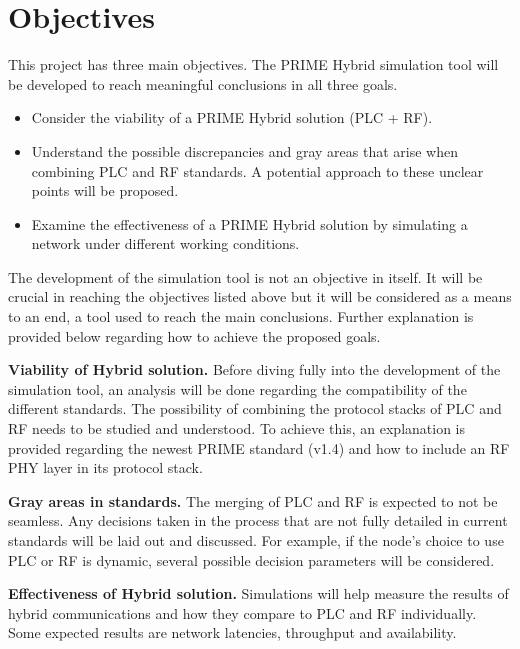 \section{Objectives}

This project has three main objectives. The PRIME Hybrid simulation tool will be developed to reach meaningful conclusions in all three goals.

\begin{itemize}
  \item Consider the viability of a PRIME Hybrid solution (PLC + RF).
  \item Understand the possible discrepancies and gray areas that arise when combining PLC and RF standards. A potential approach to these unclear points will be proposed.
  \item Examine the effectiveness of a PRIME Hybrid solution by simulating a network under different working conditions.
\end{itemize}

The development of the simulation tool is not an objective in itself. It will be crucial in reaching the objectives listed above but it will be considered as a means to an end, a tool used to reach the main conclusions. Further explanation is provided below regarding how to achieve the proposed goals.


\begin{description}
    \item \textbf{Viability of Hybrid solution.} Before diving fully into the development of the simulation tool, an analysis will be done regarding the compatibility of the different standards. The possibility of combining the protocol stacks of PLC and RF needs to be studied and understood. To achieve this, an explanation is provided regarding the newest PRIME standard (v1.4) and how to include an RF PHY layer in its protocol stack.
    \item \textbf{Gray areas in standards.} The merging of PLC and RF is expected to not be seamless. Any decisions taken in the process that are not fully detailed in current standards will be laid out and discussed. For example, if the node's choice to use PLC or RF is dynamic, several possible decision parameters will be considered.
    \item \textbf{Effectiveness of Hybrid solution.} Simulations will help measure the results of hybrid communications and how they compare to PLC and RF individually. Some expected results are network latencies, throughput and availability. 
\end{description}
